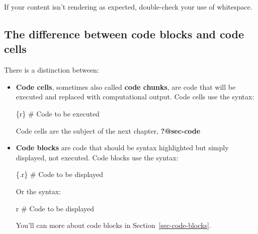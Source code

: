 \documentclass[
  letterpaper,
  DIV=11,
  numbers=noendperiod,
  oneside]{scrreprt}
\newenvironment{Shaded}{\begin{snugshade}}{\end{snugshade}}
\newcommand{\CommentTok}[1]{\textcolor[rgb]{0.37,0.37,0.37}{#1}}
\newcommand{\InformationTok}[1]{\textcolor[rgb]{0.37,0.37,0.37}{#1}}
\begin{document}
\begin{tcolorbox}
If your content isn't rendering as expected, double-check your use of
whitespace.

\subsection{The difference between code blocks and code
cells}\label{the-difference-between-code-blocks-and-code-cells}

There is a distinction between:

\begin{itemize}
\item
  \textbf{Code cells}, sometimes also called \textbf{code chunks}, are
  code that will be executed and replaced with computational output.
  Code cells use the syntax:

\begin{Shaded}
\begin{Highlighting}[]
\InformationTok{\textasciigrave{}\textasciigrave{}\textasciigrave{}\{r\}}
\CommentTok{\# Code to be executed}
\InformationTok{\textasciigrave{}\textasciigrave{}\textasciigrave{}}
\end{Highlighting}
\end{Shaded}

  Code cells are the subject of the next chapter, \textbf{?@sec-code}
\item
  \textbf{Code blocks} are code that should be syntax highlighted but
  simply displayed, not executed. Code blocks use the syntax:

\begin{Shaded}
\begin{Highlighting}[]
\InformationTok{\textasciigrave{}\textasciigrave{}\textasciigrave{}\{.r\}}
\CommentTok{\# Code to be displayed}
\InformationTok{\textasciigrave{}\textasciigrave{}\textasciigrave{}}
\end{Highlighting}
\end{Shaded}

  Or the syntax:

\begin{Shaded}
\begin{Highlighting}[]
\InformationTok{\textasciigrave{}\textasciigrave{}\textasciigrave{} r}
\CommentTok{\# Code to be displayed}
\InformationTok{\textasciigrave{}\textasciigrave{}\textasciigrave{}}
\end{Highlighting}
\end{Shaded}

  You'll can more about code blocks in Section~\ref{sec-code-blocks}.
\end{itemize}


\end{tcolorbox}
\end{document}
